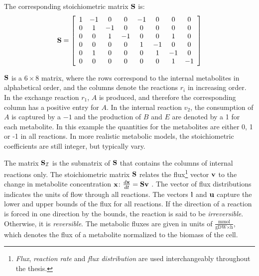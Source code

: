 The corresponding stoichiometric matrix $\bold S$ is:
\begin{equation*}
    \bold S =
    \left[\begin{array}{cccccccc}
        1 & -1 & 0 & 0 & -1 & 0 & 0 & 0\\
        0 & 1 & -1 & 0 & 0 & 0 & 0 & 0\\
        0 & 0 & 1 & -1 & 0 & 0 & 1 & 0\\
        0 & 0 & 0 & 0 & 1 & -1 & 0 & 0\\
        0 & 1 & 0 & 0 & 0 & 1 & -1 & 0\\
        0 & 0 & 0 & 0 & 0 & 0 & 1 & -1\\    
    \end{array}\right]        
\end{equation*}

$\bold S$ is a $6 \times 8$ matrix, where the rows correspond to the internal metabolites in alphabetical order, and the columns denote the reactions $r_i$ in increasing order. In the exchange reaction $r_1$, $A$ is produced, and therefore the corresponding column has a positive entry for $A$. In the internal reaction $v_2$, the consumption of $A$ is captured by a $-1$ and the production of $B$ and $E$ are denoted by a 1 for each metabolite. In this example the quantities for the metabolites are either 0, 1 or -1 in all reactions. In more realistic metabolic models, the stoichiometric coefficients are still integer, but typically vary.

The matrix $\bold S_\mathcal{I}$ is the submatrix of $\bold S$ that contains the columns of internal reactions only. 
The stoichiometric matrix $\bold S$ relates the flux\footnote{\textit{Flux}, \textit{reaction rate} and \textit{flux distribution} are used interchangeably throughout the thesis.} vector $\bold v$ to the change in metabolite concentration $\bold x$: $\frac{d \bold x}{dt} = \bold S \bold v$ \cite{noor_removing_2018}. The vector of flux distributions indicates the units of flow through all reactions. The vectors $\bold l$ and $\bold u$ capture the lower and upper bounds of the flux for all reactions. If the direction of a reaction is forced in one direction by the bounds, the reaction is said to be \textit{irreversible}. Otherwise, it is \textit{reversible}.
The metabolic fluxes are given in units of $\frac{\text{mmol}}{\text{gDW} \times \text{h}}$, which denotes the flux of a metabolite normalized to the biomass of the cell.

